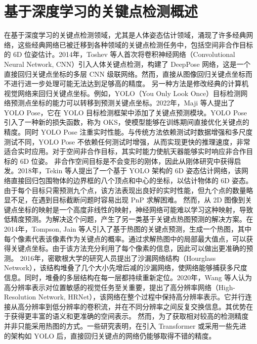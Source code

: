 \section{基于深度学习的关键点检测概述}
在基于深度学习的关键点检测领域，尤其是人体姿态估计领域，涌现了许多经典网络，这些经典网络已被迁移到各种领域的关键点检测任务中，包括空间非合作目标的 6D 位姿估计。2014年，Toshev 等人首次将卷积神经网络（Convolutional Neural Network, CNN）引入人体关键点检测，构建了 DeepPose 网络，这是一个直接回归关键点坐标的多层 CNN 级联网络\citep{toshev2014deeppose}。然而，直接从图像回归关键点坐标而不进行进一步处理可能无法达到足够高的精度。
另一种方法是修改经典的计算机视觉网络来回归关键点坐标。例如，YOLO（You Only Look Once）目标检测网络预测点坐标的能力可以转移到预测关键点坐标。2022年，Maji 等人提出了 YOLO Pose\citep{yolo_pose}，它在 YOLO 目标检测框架中添加了关键点预测模块。YOLO Pose 引入了一种新的损失函数，称为 OKS，使模型能够在训练期间直接优化关键点的精度。同时 YOLO Pose 注重实时性能。与传统方法依赖测试时数据增强和多尺度测试不同，YOLO Pose 不依赖任何测试时增强，从而实现更快的推理速度，非常适合实时应用。对于空间非合作目标，其实时能力使航天器能够实时响应非合作目标的 6D 位姿。
非合作空间目标是不会变形的刚体，因此从刚体研究中获得启发。2018年，Tekin 等人提出了一个基于 YOLO 架构的 6D 姿态估计网络，该网络直接回归包围物体的边界框的八个顶点和中心的坐标，以估计物体的 6D 姿态\citep{tekin2018real}。由于每个目标只需预测九个点，该方法表现出良好的实时性能，但九个点的数量略显不足，在遇到目标截断问题时容易出现 PnP 求解困难。
然而，从 2D 图像到关键点坐标的映射是一个高度非线性的映射，神经网络可能难以学习这种映射，导致低精度预测。为解决这个问题，产生了另一类基于关键点热图预测的解决方案。在2014年，Tompson, Jain 等人引入了基于热图的关键点预测，生成一个热图，其中每个像素代表该像素作为关键点的概率\citep{tompson2014joint}。通过求解热图中的局部最大值点，可以获得关键点坐标。由于该方法充分利用了每个像素的信息，因此可以做出更准确的预测。
2016年，密歇根大学的研究人员提出了沙漏网络结构（Hourglass Network）\citep{newell2016stacked}，该结构堆叠了几个大小先增后减的沙漏网络，使网络能够捕获多尺度信息。同时，堆叠的多层结构在每一层都持续重新定位。2020年，Wang 等人认为高分辨率表示对位置敏感的视觉任务至关重要，提出了高分辨率网络（High-Resolution Network, HRNet）\citep{wang2020deep}，该网络在整个过程中保持高分辨率表示。它并行连接从高分辨率到低分辨率的卷积流，并在不同分辨率之间反复交换信息。其优势在于获得更丰富的语义和更准确的空间表示。
然而，为了获取相对较高的检测精度并非只能采用热图的方式。一些研究表明\citep{mao2022poseur, 10394434, lu2024ksl}，在引入 Transformer 或采用一些先进的架构如 YOLO 后，直接回归关键点的网络仍能够取得不错的精度。


